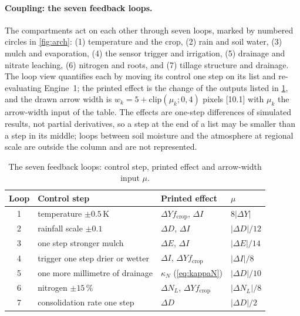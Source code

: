 \documentclass[preprint,12pt]{elsarticle}
\begin{document}
\paragraph{Coupling: the seven feedback loops.}
\label{sec:sys-loops}
The compartments act on each other through seven loops, marked by numbered circles in \cref{fig:arch}: (1) temperature and the crop, (2) rain and soil water, (3) mulch and evaporation, (4) the sensor trigger and irrigation, (5) drainage and nitrate leaching, (6) nitrogen and roots, and (7) tillage structure and drainage. The loop view quantifies each by moving its control one step on its list and re-evaluating Engine~1; the printed effect is the change of the outputs listed in \cref{tab:loops}, and the drawn arrow width is $w_k=5+\mathrm{clip}(\mu_k;0,4)$ pixels [10.1] with $\mu_k$ the arrow-width input of the table. The effects are one-step differences of simulated results, not partial derivatives, so a step at the end of a list may be smaller than a step in its middle; loops between soil moisture and the atmosphere at regional scale \cite{Entekhabi1996,Koster2004,Seneviratne2010} are outside the column and are not represented.

\begin{table}[H]\centering\small
\caption{The seven feedback loops: control step, printed effect and arrow-width input $\mu$.}
\label{tab:loops}
\begin{tabular}{clll}
\toprule
Loop & Control step & Printed effect & $\mu$\\\midrule
1 & temperature $\pm0.5$\,K & $\Delta Y f_{\mathrm{crop}}$, $\Delta I$ & $8|\Delta Y|$\\
2 & rainfall scale $\pm0.1$ & $\Delta D$, $\Delta I$ & $|\Delta D|/12$\\
3 & one step stronger mulch & $\Delta E$, $\Delta I$ & $|\Delta E|/14$\\
4 & trigger one step drier or wetter & $\Delta I$, $\Delta Y f_{\mathrm{crop}}$ & $|\Delta I|/8$\\
5 & one more millimetre of drainage & $\kappa_N$ (\cref{eq:kappaN}) & $|\Delta D|/10$\\
6 & nitrogen $\pm15$\,\% & $\Delta N_L$, $\Delta Y f_{\mathrm{crop}}$ & $|\Delta N_L|/8$\\
7 & consolidation rate one step & $\Delta D$ & $|\Delta D|/2$\\\bottomrule
\end{tabular}
\end{table}
\end{document}
